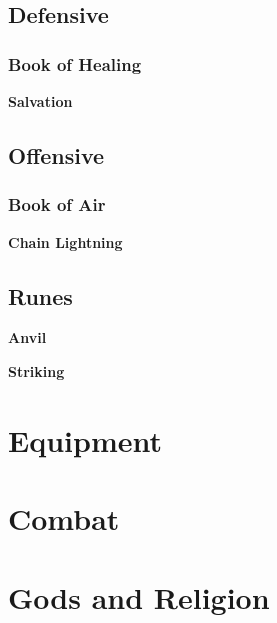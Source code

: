 \documentclass[12pt]{article}
\newcommand{\subsubsubsection}[1]{%
  \vspace{1em} %
  \noindent\textbf{\small #1}\par
  \vspace{0.5em} %
}
\begin{document}
\subsection{Defensive}
\subsubsection{Book of Healing}
\subsubsubsection{Salvation}
\subsection{Offensive}
\subsubsection{Book of Air}
\subsubsubsection{Chain Lightning}
\subsection{Runes}
\subsubsubsection{Anvil}
\subsubsubsection{Striking}





\section{Equipment}
\section{Combat}
\section{Gods and Religion}










\newpage
\newpage

	
\newpage


\newpage
\newpage
\newpage
\printindex
\end{document}
